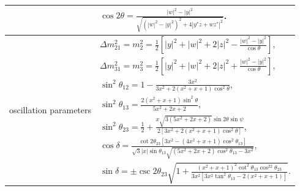 \documentclass[aps,prd,nofootinbib,preprint]{revtex4}
\begin{document}
\begin{table}[h!]
\begin{tabular}{l|l}
                                                 & $\cos2\theta=\frac{|w|^2-|y|^2}{\sqrt{(|w|^2-|y|^2)^2+4|y^{*}z+wz^{*}|^2}}$.                                                                                                                     \\\hline
\multirow{7}{*}{oscillation parameters}          & $\Delta m_{21}^2=m^2_2=\frac{1}{2}\left[\left|y\right|^2+\left|w\right|^2+2\left|z\right|^2-\frac{\left|w\right|^2-\left|y\right|^2}{\cos\theta}\right]$,                                        \\
                                                 & $\Delta m_{31}^2=m^2_3=\frac{1}{2}\left[\left|y\right|^2+\left|w\right|^2+2\left|z\right|^2+\frac{\left|w\right|^2-\left|y\right|^2}{\cos\theta}\right]$,                                        \\
                                                 & $\sin^2\theta_{12}=1-\frac{3x^2 }{3x^2+2\left(x^2+x+1\right) \cos^2\theta }$,                                                                                                                  \\
                                                                                                  & $\sin^2\theta_{13}=\frac{2\left(x^2+x+1\right)\sin^2\theta}{5x^2+2x+2}$,                                                                                                                       \\
                                                 & $\sin^2\theta_{23}=\frac{1}{2}+\frac{x\sqrt{3\left(5x^2+2x+2\right)}\sin2\theta\sin\psi }{2\left[3x^2+2\left(x^2+x+1\right) \cos^ 2 \theta\right]}$,                                          \\
                                                 & $\cos\delta=\frac{ \cot 2 \theta_{23} \left[3x^2-\left(4x^2+ x+1\right)\cos^2\theta_{13}\right]}{\sqrt{3} \left|x\right| \sin \theta_{13} \sqrt{\left(5x^2+2x+2\right)\cos^2\theta_{13}-3x^2}}$, \\
                                                 & $\sin\delta= \pm\csc 2 \theta_{23} \sqrt{1+\frac{\left(x^2+x+1\right)^2 \cot ^2\theta_{13} \cos ^22 \theta_{23}}{3x^2 \left[3x^2 \tan ^2\theta_{13}-2 \left(x^2+x+1\right)\right]}}$.   \\\hline \hline       
\end{tabular}
\end{table}
\end{document}
